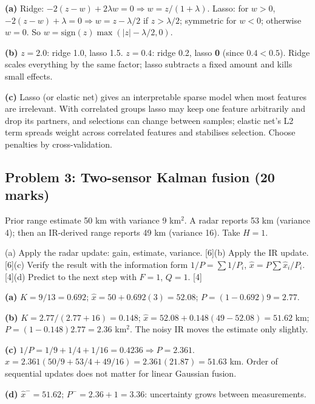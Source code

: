 \documentclass[11pt]{article}
\begin{document}
\begin{soln}\textbf{(a)} Ridge: $-2(z-w)+2\lambda w=0\Rightarrow w=z/(1+\lambda)$. Lasso: for $w>0$, $-2(z-w)+\lambda=0\Rightarrow w=z-\lambda/2$ if $z>\lambda/2$; symmetric for $w<0$; otherwise $w=0$. So $w=\text{sign}(z)\max(|z|-\lambda/2,0)$.

\textbf{(b)} $z=2.0$: ridge 1.0, lasso 1.5. $z=0.4$: ridge 0.2, lasso \textbf{0} (since $0.4<0.5$). Ridge scales everything by the same factor; lasso subtracts a fixed amount and kills small effects.

\textbf{(c)} Lasso (or elastic net) gives an interpretable sparse model when most features are irrelevant. With correlated groups lasso may keep one feature arbitrarily and drop its partners, and selections can change between samples; elastic net's L2 term spreads weight across correlated features and stabilises selection. Choose penalties by cross-validation.\end{soln}

\subsection{Problem 3: Two-sensor Kalman fusion \normalfont\small\color{GreyN}(20 marks)}

\begin{prob}Prior range estimate 50 km with variance 9 km$^2$. A radar reports 53 km (variance 4); then an IR-derived range reports 49 km (variance 16). Take $H=1$.

(a) Apply the radar update: gain, estimate, variance. [6]\newline (b) Apply the IR update. [6]\newline (c) Verify the result with the information form $1/P=\sum1/P_i$, $\hat x=P\sum\hat x_i/P_i$. [4]\newline (d) Predict to the next step with $F=1$, $Q=1$. [4]\end{prob}

\begin{soln}\textbf{(a)} $K=9/13=0.692$; $\hat x=50+0.692(3)=52.08$; $P=(1-0.692)9=2.77$.

\textbf{(b)} $K=2.77/(2.77+16)=0.148$; $\hat x=52.08+0.148(49-52.08)=\mathbf{51.62}$ km; $P=(1-0.148)2.77=\mathbf{2.36}$ km$^2$. The noisy IR moves the estimate only slightly.

\textbf{(c)} $1/P=1/9+1/4+1/16=0.4236\Rightarrow P=2.361$. $\hat x=2.361(50/9+53/4+49/16)=2.361(21.87)=51.63$ km. Order of sequential updates does not matter for linear Gaussian fusion.

\textbf{(d)} $\hat x^-=51.62$; $P^-=2.36+1=\mathbf{3.36}$: uncertainty grows between measurements.\end{soln}
\end{document}
